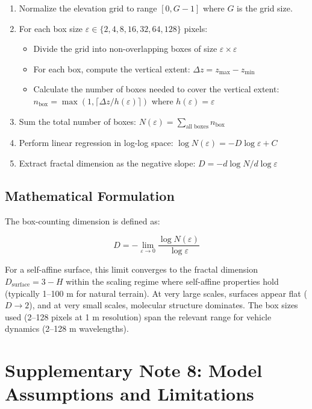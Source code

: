 \documentclass[11pt]{article}
\begin{document}
\begin{enumerate}
\item Normalize the elevation grid to range $[0, G-1]$ where $G$ is the grid size.

\item For each box size $\varepsilon \in \{2, 4, 8, 16, 32, 64, 128\}$ pixels:
\begin{itemize}
\item Divide the grid into non-overlapping boxes of size $\varepsilon \times \varepsilon$
\item For each box, compute the vertical extent: $\Delta z = z_{\max} - z_{\min}$
\item Calculate the number of boxes needed to cover the vertical extent: $n_{\text{box}} = \max(1, \lceil \Delta z / h(\varepsilon) \rceil)$ where $h(\varepsilon) = \varepsilon$
\end{itemize}

\item Sum the total number of boxes: $N(\varepsilon) = \sum_{\text{all boxes}} n_{\text{box}}$

\item Perform linear regression in log-log space: $\log N(\varepsilon) = -D \log \varepsilon + C$

\item Extract fractal dimension as the negative slope: $D = -d\log N / d\log \varepsilon$
\end{enumerate}

\subsection{Mathematical Formulation}

The box-counting dimension is defined as:

\begin{equation}
D = -\lim_{\varepsilon \to 0} \frac{\log N(\varepsilon)}{\log \varepsilon}
\end{equation}

For a self-affine surface, this limit converges to the fractal dimension $D_{\text{surface}} = 3 - H$ within the scaling regime where self-affine properties hold (typically 1–100 m for natural terrain). At very large scales, surfaces appear flat ($D \to 2$), and at very small scales, molecular structure dominates. The box sizes used (2–128 pixels at 1 m resolution) span the relevant range for vehicle dynamics (2–128 m wavelengths).

\section{Supplementary Note 8: Model Assumptions and Limitations}
\end{document}
